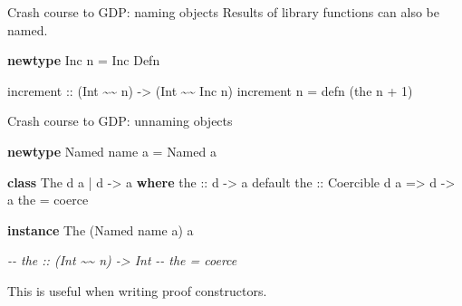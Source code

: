 \documentclass[
  9pt,
  ignorenonframetext,
]{beamer}
\newenvironment{Shaded}{}{}
\newcommand{\CommentTok}[1]{\textcolor[rgb]{0.38,0.63,0.69}{\textit{#1}}}
\newcommand{\DataTypeTok}[1]{\textcolor[rgb]{0.56,0.13,0.00}{#1}}
\newcommand{\DecValTok}[1]{\textcolor[rgb]{0.25,0.63,0.44}{#1}}
\newcommand{\KeywordTok}[1]{\textcolor[rgb]{0.00,0.44,0.13}{\textbf{#1}}}
\newcommand{\NormalTok}[1]{#1}
\newcommand{\OperatorTok}[1]{\textcolor[rgb]{0.40,0.40,0.40}{#1}}
\newcommand{\OtherTok}[1]{\textcolor[rgb]{0.00,0.44,0.13}{#1}}
\begin{document}
\begin{frame}[fragile]{Crash course to GDP: naming objects}
\protect\hypertarget{crash-course-to-gdp-naming-objects-5}{}
Results of library functions can also be named.

\begin{Shaded}
\begin{Highlighting}[]
\KeywordTok{newtype} \DataTypeTok{Inc}\NormalTok{ n }\OtherTok{=} \DataTypeTok{Inc} \DataTypeTok{Defn}

\OtherTok{increment ::}\NormalTok{ (}\DataTypeTok{Int} \OperatorTok{\textasciitilde{}\textasciitilde{}}\NormalTok{ n) }\OtherTok{{-}\textgreater{}}\NormalTok{ (}\DataTypeTok{Int} \OperatorTok{\textasciitilde{}\textasciitilde{}} \DataTypeTok{Inc}\NormalTok{ n)}
\NormalTok{increment n }\OtherTok{=}\NormalTok{ defn (the n }\OperatorTok{+} \DecValTok{1}\NormalTok{)}
\end{Highlighting}
\end{Shaded}









\end{frame}

\begin{frame}[fragile]{Crash course to GDP: unnaming objects}
\protect\hypertarget{crash-course-to-gdp-unnaming-objects}{}
\begin{Shaded}
\begin{Highlighting}[]
\KeywordTok{newtype} \DataTypeTok{Named}\NormalTok{ name a }\OtherTok{=} \DataTypeTok{Named}\NormalTok{ a}

\KeywordTok{class} \DataTypeTok{The}\NormalTok{ d a }\OperatorTok{|}\NormalTok{ d }\OtherTok{{-}\textgreater{}}\NormalTok{ a }\KeywordTok{where}
\OtherTok{  the ::}\NormalTok{ d }\OtherTok{{-}\textgreater{}}\NormalTok{ a}
\NormalTok{  default}\OtherTok{ the ::} \DataTypeTok{Coercible}\NormalTok{ d a }\OtherTok{=\textgreater{}}\NormalTok{ d }\OtherTok{{-}\textgreater{}}\NormalTok{ a}
\NormalTok{  the }\OtherTok{=}\NormalTok{ coerce}

\KeywordTok{instance} \DataTypeTok{The}\NormalTok{ (}\DataTypeTok{Named}\NormalTok{ name a) a}

\CommentTok{{-}{-} the :: (Int \textasciitilde{}\textasciitilde{} n) {-}\textgreater{} Int}
\CommentTok{{-}{-} the = coerce}
\end{Highlighting}
\end{Shaded}

This is useful when writing proof constructors.




\end{frame}
\end{document}
